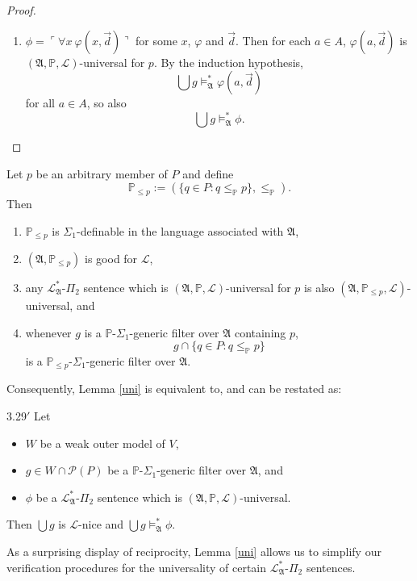 \documentclass[12pt]{article}
\numberwithin{equation}{section}
\begin{document}
\begin{proof}
\begin{enumerate}[label=Case \arabic*:, leftmargin=50pt]
    \item $\phi = \ulcorner \forall x \ \varphi(x, \Vec{d}) \urcorner$ for some $x$, $\varphi$ and $\Vec{d}$. Then for each $a \in A$, $\varphi(a, \Vec{d})$ is $(\mathfrak{A}, \mathbb{P}, \mathcal{L})$-universal for $p$. By the induction hypothesis, $$\bigcup g \models^{*}_{\mathfrak{A}} \varphi(a, \Vec{d})$$ for all $a \in A$, so also $$\bigcup g \models^{*}_{\mathfrak{A}} \phi.$$ \qedhere
\end{enumerate}
\end{proof}

\begin{rem}\label{endremmain}
Let $p$ be an arbitrary member of $P$ and define $$\mathbb{P}_{\leq p} := (\{q \in P : q \leq_{\mathbb{P}} p\}, \leq_{\mathbb{P}}).$$ Then 
\begin{enumerate}[label=(\arabic*)]
    \item $\mathbb{P}_{\leq p}$ is $\Sigma_1$-definable in the language associated with $\mathfrak{A}$, 
    \item $(\mathfrak{A}, \mathbb{P}_{\leq p})$ is good for $\mathcal{L}$, 
    \item any $\mathcal{L}^{*}_{\mathfrak{A}}$-$\Pi_2$ sentence which is $(\mathfrak{A}, \mathbb{P}, \mathcal{L})$-universal for $p$ is also $(\mathfrak{A}, \mathbb{P}_{\leq p}, \mathcal{L})$-universal, and
    \item whenever $g$ is a $\mathbb{P}$-$\Sigma_1$-generic filter over $\mathfrak{A}$ containing $p$, $$g \cap \{q \in P : q \leq_{\mathbb{P}} p\}$$ is a $\mathbb{P}_{\leq p}$-$\Sigma_1$-generic filter over $\mathfrak{A}$.
\end{enumerate}
Consequently, Lemma \ref{uni} is equivalent to, and can be restated as:
\begin{customlem}{3.29$'$}
Let 
\begin{itemize} 
    \item $W$ be a weak outer model of $V$,
    \item $g \in W \cap \mathcal{P}(P)$ be a $\mathbb{P}$-$\Sigma_1$-generic filter over $\mathfrak{A}$, and
    \item $\phi$ be a $\mathcal{L}^{*}_{\mathfrak{A}}$-$\Pi_2$ sentence which is $(\mathfrak{A}, \mathbb{P}, \mathcal{L})$-universal.
\end{itemize} 
Then $\bigcup g$ is $\mathcal{L}$-nice and $\bigcup g \models^{*}_{\mathfrak{A}} \phi$.
\end{customlem}
\end{rem}

As a surprising display of reciprocity, Lemma \ref{uni} allows us to simplify our verification procedures for the universality of certain $\mathcal{L}^{*}_{\mathfrak{A}}$-$\Pi_2$ sentences.
\end{document}
